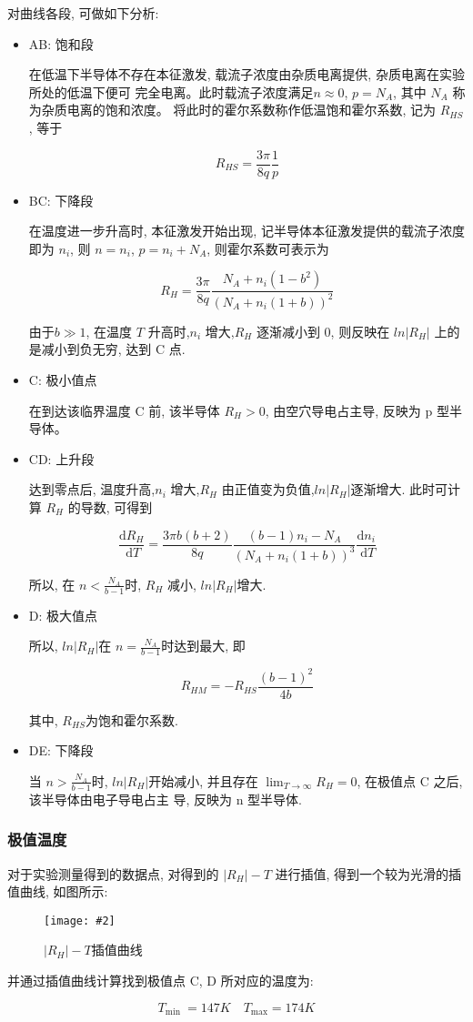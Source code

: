 \documentclass[12pt,a4paper]{article}
\newcommand{\be}[1]{
    \begin{equation}
        #1
    \end{equation}
}
\newcommand{\bfig}[3]{
    \begin{figure}[H]
        \centering
        \texttt{[image: \#2]}
        \caption{#3}
    \end{figure}
}
\begin{document}
对曲线各段, 可做如下分析:
\begin{itemize}
    \item AB: 饱和段
    
    在低温下半导体不存在本征激发, 载流子浓度由杂质电离提供, 杂质电离在实验所处的低温下便可
完全电离。此时载流子浓度满足$ n \approx 0$, $p = N_A$, 其中 $N_A$ 称为杂质电离的饱和浓度。
将此时的霍尔系数称作低温饱和霍尔系数, 记为 $R_{HS}$ , 等于
\be{R_{H S}=\frac{3 \pi}{8 q} \frac{1}{p}}
    \item BC: 下降段
    
    在温度进一步升高时, 本征激发开始出现, 记半导体本征激发提供的载流子浓度即为 $n_i$, 则 $n = n_i$, $p =n_i + N_A$, 
    则霍尔系数可表示为
\be{R_{H}=\frac{3 \pi}{8 q} \frac{N_{A}+n_{i}\left(1-b^{2}\right)}{\left(N_{A}+n_{i}(1+b)\right)^{2}}}
由于$ b \gg 1$, 在温度 $T$ 升高时,$n_i$ 增大,$ R_H$ 逐渐减小到 0, 则反映在 $ln |R_H|$ 上的是减小到负无穷, 达到
C 点.
    \item C: 极小值点
    
    在到达该临界温度 C 前, 该半导体 $R_H > 0$, 由空穴导电占主导, 反映为 p 型半导体。
    \item CD: 上升段
    
    达到零点后, 温度升高,$n_i$ 增大,$R_H$ 由正值变为负值,$ln |R_H| $逐渐增大. 此时可计算 $R_H$ 的导数, 可得到
    \be{\frac{\mathrm{d} R_{H}}{\mathrm{~d} T}=\frac{3 \pi b(b+2)}{8 q} \frac{(b-1) n_{i}-N_{A}}{\left(N_{A}+n_{i}(1+b)\right)^{3}} \frac{\mathrm{d} n_{i}}{\mathrm{~d} T}}
    所以, 在 $n <\frac{N_A}{b − 1}$时, $R_H$ 减小, $ln |R_H| $增大.
    \item D: 极大值点
    
    所以, $ ln |R_H| $在 $n =\frac{N_A}{b − 1}$时达到最大, 即
    \be{R_{H M}=-R_{H S} \frac{(b-1)^{2}}{4 b}}
    其中, $R_{HS} $为饱和霍尔系数.
    \item DE: 下降段

    当 $n >\frac{N_A}{b − 1}$时, $ln |R_H| $开始减小, 并且存在 $\lim_{T \to \infty}R_H = 0$, 在极值点 C 之后, 该半导体由电子导电占主
导, 反映为 n 型半导体.
\end{itemize}

\subsubsection{极值温度}

对于实验测量得到的数据点, 对得到的 $|R_H| - T$ 进行插值, 得到一个较为光滑的插值曲线, 如图所示:
\bfig{0.8}{rh-T.png}{$|R_H|-T$插值曲线}
并通过插值曲线计算找到极值点 C, D 所对应的温度为:
\be{T_{\text {min }}=147K \quad T_{\max }=174K}
\end{document}
